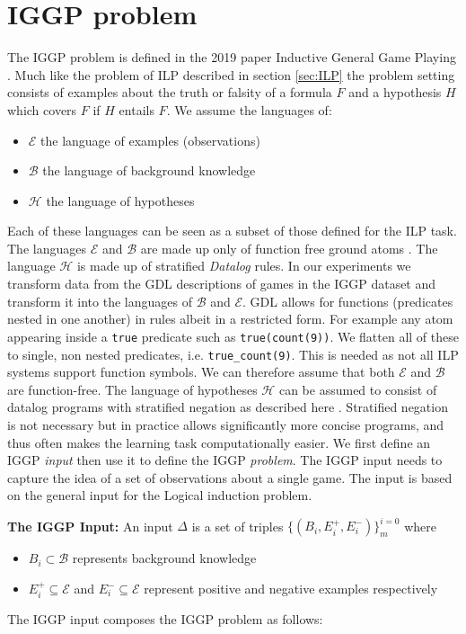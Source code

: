 \chapter{IGGP problem}
\label{ch:IGGP}

The IGGP problem is defined in the 2019 paper Inductive General Game Playing \cite{Cropper/IGGP}. Much like the problem of ILP described in section \ref{sec:ILP} the problem setting consists of examples about the truth or falsity of a formula $F$ and a hypothesis $H$ which covers $F$ if $H$ entails $F$. We assume the languages of:
\begin{itemize}
\item $\mathscr{E}$ the language of examples (observations)
\item $\mathscr{B}$ the language of background knowledge
\item $\mathscr{H}$ the language of hypotheses
\end{itemize}
Each of these languages can be seen as a subset of those defined for the ILP task. The languages $\mathscr{E}$ and $\mathscr{B}$  are made up only of function free ground atoms \cite{Uwe/Logic}. The language $\mathscr{H}$ is made up of stratified \textit{Datalog} rules. In our experiments we transform data from the GDL descriptions of games in the IGGP dataset and transform it into the languages of $\mathscr{B}$ and $\mathscr{E}$. GDL allows for functions (predicates nested in one another) in rules albeit in a restricted form. For example any atom appearing inside a \texttt{true} predicate such as \texttt{true(count(9))}. We flatten all of these to single, non nested predicates, i.e. \verb|true_count(9)|. This is needed as not all ILP systems support function symbols. We can therefore assume that both $\mathscr{E}$ and $\mathscr{B}$ are function-free. The language of hypotheses $\mathscr{H}$ can be assumed to consist of datalog programs with stratified negation as described here \cite{Kenneth}. Stratified negation is not necessary but in practice allows significantly more concise programs, and thus often makes the learning task computationally easier. We first define an IGGP \textit{input} then use it to define the IGGP \textit{problem}. The IGGP input needs to capture the idea of a set of observations about a single game. The input is based on the general input for the Logical induction problem.

\textbf{The IGGP Input:} An input $\Delta$ is a set of triples $\{(B_i,E_i^+,E_i^-)\}_m^{i=0}$ where
\begin{itemize}
\item $B_i \subset \mathscr{B}$ represents background knowledge
\item $E_i^+ \subseteq \mathscr{E}$ and $E_i^- \subseteq \mathscr{E}$ represent positive and negative examples respectively
\end{itemize}
The IGGP input composes the IGGP problem as follows:

